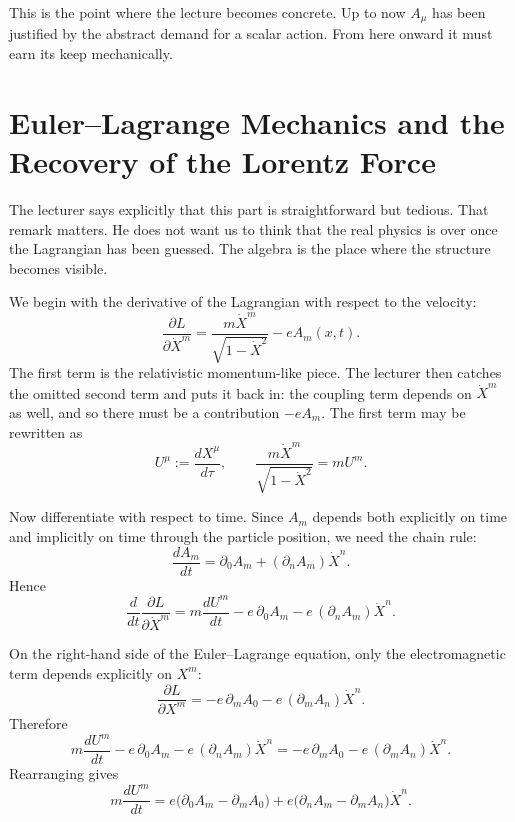 This is the point where the lecture becomes concrete. Up to now \(A_\mu\) has been justified by the abstract demand for a scalar action. From here onward it must earn its keep mechanically.

\section{Euler--Lagrange Mechanics and the Recovery of the Lorentz Force}

The lecturer says explicitly that this part is straightforward but tedious. That remark matters. He does not want us to think that the real physics is over once the Lagrangian has been guessed. The algebra is the place where the structure becomes visible.

We begin with the derivative of the Lagrangian with respect to the velocity:
\begin{equation}
\frac{\partial L}{\partial \dot X^m}
=
\frac{m\dot X^m}{\sqrt{1-\dot X^2}}-eA_m(x,t).
\end{equation}
The first term is the relativistic momentum-like piece. The lecturer then catches the omitted second term and puts it back in: the coupling term depends on \(\dot X^m\) as well, and so there must be a contribution \(-eA_m\). The first term may be rewritten as
\begin{equation}
U^\mu:=\frac{dX^\mu}{d\tau},
\qquad
\frac{m\dot X^m}{\sqrt{1-\dot X^2}}=mU^m.
\end{equation}

Now differentiate with respect to time. Since \(A_m\) depends both explicitly on time and implicitly on time through the particle position, we need the chain rule:
\begin{equation}
\frac{dA_m}{dt}
=
\partial_0A_m+(\partial_nA_m)\dot X^n.
\end{equation}
Hence
\begin{equation}
\frac{d}{dt}\frac{\partial L}{\partial \dot X^m}
=
m\frac{dU^m}{dt}
-
e\,\partial_0A_m
-
e\,(\partial_nA_m)\dot X^n.
\end{equation}

On the right-hand side of the Euler--Lagrange equation, only the electromagnetic term depends explicitly on \(X^m\):
\begin{equation}
\frac{\partial L}{\partial X^m}
=
-e\,\partial_mA_0
-e\,(\partial_mA_n)\dot X^n.
\end{equation}
Therefore
\begin{equation}
m\frac{dU^m}{dt}
-
e\,\partial_0A_m
-
e\,(\partial_nA_m)\dot X^n
=
-e\,\partial_mA_0
-e\,(\partial_mA_n)\dot X^n.
\end{equation}
Rearranging gives
\begin{equation}
m\frac{dU^m}{dt}
=
e\bigl(\partial_0A_m-\partial_mA_0\bigr)
+
e\bigl(\partial_nA_m-\partial_mA_n\bigr)\dot X^n.
\end{equation}

